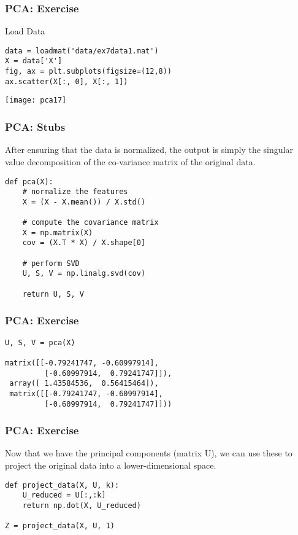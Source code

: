 \begin{frame}[fragile]\frametitle{PCA: Exercise}
Load Data
\begin{lstlisting}
data = loadmat('data/ex7data1.mat')
X = data['X']
fig, ax = plt.subplots(figsize=(12,8))
ax.scatter(X[:, 0], X[:, 1])
\end{lstlisting}
\begin{center}
\texttt{[image: pca17]}
\end{center}
\end{frame}

\begin{frame}[fragile]\frametitle{PCA: Stubs}
 After ensuring that the data is normalized, the output is simply the singular value decomposition of the co-variance matrix of the original data.
\begin{lstlisting}
def pca(X):
    # normalize the features
    X = (X - X.mean()) / X.std()
    
    # compute the covariance matrix
    X = np.matrix(X)
    cov = (X.T * X) / X.shape[0]
    
    # perform SVD
    U, S, V = np.linalg.svd(cov)
    
    return U, S, V
\end{lstlisting}
\end{frame}

\begin{frame}[fragile]\frametitle{PCA: Exercise}
\begin{lstlisting}
U, S, V = pca(X)    

matrix([[-0.79241747, -0.60997914],
         [-0.60997914,  0.79241747]]),
 array([ 1.43584536,  0.56415464]),
 matrix([[-0.79241747, -0.60997914],
         [-0.60997914,  0.79241747]]))
\end{lstlisting}
\end{frame}


\begin{frame}[fragile]\frametitle{PCA: Exercise}
Now that we have the principal components (matrix U), we can use these to project the original data into a lower-dimensional space. 
\begin{lstlisting}
def project_data(X, U, k):
    U_reduced = U[:,:k]
    return np.dot(X, U_reduced)

Z = project_data(X, U, 1)
\end{lstlisting}
\end{frame}

